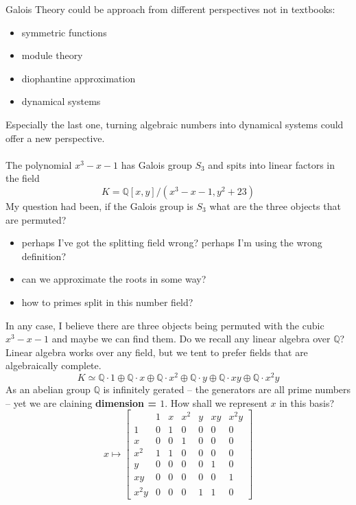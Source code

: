 \documentclass[12pt]{article}
\begin{document}
\newpage 

\noindent Galois Theory could be approach from different perspectives not in textbooks:
\begin{itemize}
\item symmetric functions
\item module theory
\item diophantine approximation
\item dynamical systems
\end{itemize}
Especially the last one, turning algebraic numbers into dynamical systems could offer a new perspective. \\ \\
The polynomial $x^3 - x - 1$ has Galois group $S_3$ and spits into linear factors in the field 
$$K = \mathbb{Q}[x,y]/(x^3 - x - 1,y^2 + 23)$$
My question had been, if the Galois group is $S_3$ what are the three objects that are permuted?   \begin{itemize}
\item perhaps I've got the splitting field wrong? perhaps I'm using the wrong definition?
\item can we approximate the roots in some way?
\item how to primes split in this number field?
\end{itemize}
In any case, I believe there are three objects being permuted with the cubic $x^3 - x - 1$ and maybe we can find them.  Do we recall any linear algebra over $\mathbb{Q}$?  Linear algebra works over any field, but we tent to prefer fields that are algebraically complete.
$$ K \simeq 
\mathbb{Q}\cdot 1 \oplus 
\mathbb{Q}\cdot x \oplus 
\mathbb{Q}\cdot x^2 \oplus 
\mathbb{Q}\cdot y \oplus 
\mathbb{Q}\cdot xy \oplus
\mathbb{Q}\cdot x^2 y   $$
As an abelian group $\mathbb{Q}$ is infinitely gerated -- the generators are all prime numbers -- yet we are claining \textbf{dimension = $1$}.  How shall we represent $x$ in this basis?
$$ x \mapsto
\left[ 
\begin{array}{l||ccc|ccc}
 & 1 & x & x^2 & y & xy & x^2 y \\ \hline\hline 
 1 &  0 & 1 & 0 & 0 & 0 & 0 \\
 x &  0 & 0 & 1 & 0 & 0 & 0 \\
 x^2 & 1 & 1 & 0 & 0 & 0 & 0 \\ \hline
 y & 0 & 0 & 0 & 0 & 1 & 0 \\
 xy & 0 & 0 & 0 & 0 & 0 & 1 \\
 x^2 y & 0 & 0 & 0 & 1 & 1 & 0 
\end{array}\right] $$
\end{document}
